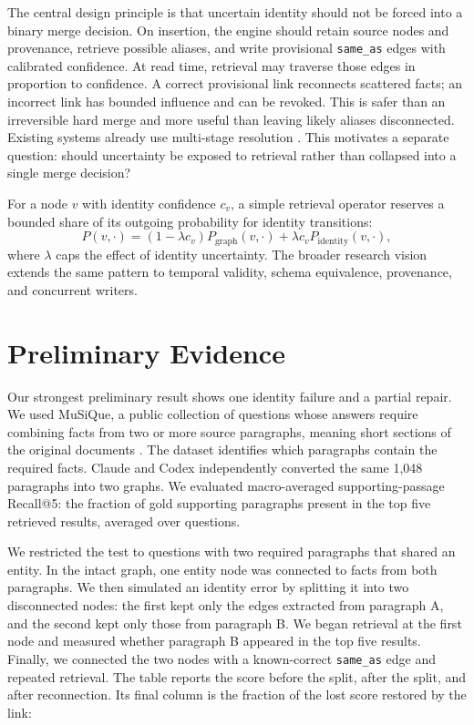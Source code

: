 \documentclass[10pt]{article}
\begin{document}
The central design principle is that uncertain identity should not be forced into a
binary merge decision. On insertion, the engine should retain source nodes and
provenance, retrieve possible aliases, and write provisional \texttt{same\_as} edges
with calibrated confidence. At read time, retrieval may traverse those edges in
proportion to confidence. A correct provisional link reconnects scattered facts; an
incorrect link has bounded influence and can be revoked. This is safer than an
irreversible hard merge and more useful than leaving likely aliases disconnected.
Existing systems already use multi-stage resolution \cite{zep,linkkg,degrag}. This
motivates a separate question: should uncertainty be exposed to retrieval rather than
collapsed into a single merge decision?

For a node $v$ with identity confidence $c_v$, a simple retrieval operator reserves a
bounded share of its outgoing probability for identity transitions:
\[
P(v,\cdot)=(1-\lambda c_v)P_{\mathrm{graph}}(v,\cdot)
            +\lambda c_v P_{\mathrm{identity}}(v,\cdot),
\]
where $\lambda$ caps the effect of identity uncertainty. The broader research vision
extends the same pattern to temporal validity, schema equivalence, provenance, and
concurrent writers.

\section{Preliminary Evidence}

Our strongest preliminary result shows one identity failure and a partial repair. We
used MuSiQue, a public collection of questions whose answers require combining facts
from two or more source paragraphs, meaning short sections of the original documents
\cite{musique}. The dataset identifies which
paragraphs contain the required facts. Claude and Codex independently converted the
same 1,048 paragraphs into two graphs. We evaluated macro-averaged supporting-passage
Recall@5: the fraction of gold supporting paragraphs present in the top five retrieved
results, averaged over questions.

We restricted the test to questions with two required paragraphs that shared an
entity. In the intact graph, one entity node was connected to facts from both
paragraphs. We then simulated an identity error by splitting it into two disconnected
nodes: the first kept only the edges extracted from paragraph A, and the second kept
only those from paragraph B. We began retrieval at the first node and measured whether
paragraph B appeared in the top five results. Finally, we connected the two nodes with
a known-correct \texttt{same\_as} edge and repeated retrieval. The table reports the
score before the split, after the split, and after reconnection. Its final column is
the fraction of the lost score restored by the link:
\end{document}
